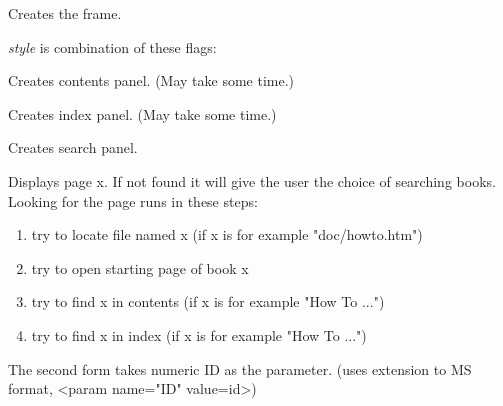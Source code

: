 Creates the frame.

{\it style} is combination of these flags:

\begin{twocollist}\itemsep=0pt
\end{twocollist}

\label{wxhtmlhelpframecreatecontents}


Creates contents panel. (May take some time.)

\label{wxhtmlhelpframecreateindex}


Creates index panel. (May take some time.)

\label{wxhtmlhelpframecreatesearch}


Creates search panel.

\label{wxhtmlhelpframedisplay}



Displays page x. If not found it will give the user the choice of
searching books.
Looking for the page runs in these steps:

\begin{enumerate}\itemsep=0pt
\item try to locate file named x (if x is for example "doc/howto.htm")
\item try to open starting page of book x
\item try to find x in contents (if x is for example "How To ...")
\item try to find x in index (if x is for example "How To ...")
\end{enumerate}

The second form takes numeric ID as the parameter.
(uses extension to MS format, <param name="ID" value=id>)

